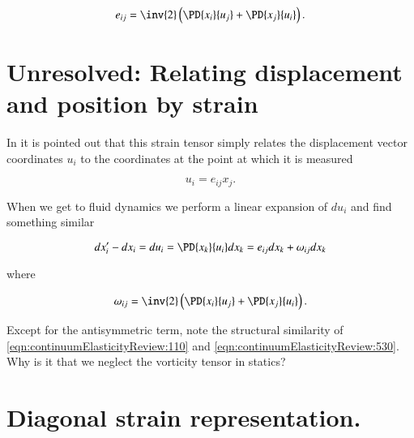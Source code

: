 \begin{equation}\label{eqn:continuumElasticityReview:90}
e_{ij}
=
\inv{2}
\left( 
\PD{x_i}{u_j} + 
\PD{x_j}{u_i} 
\right).
\end{equation}

\section{Unresolved: Relating displacement and position by strain}

In \cite{feynman1963flp:elasticMaterials} it is pointed out that this strain tensor simply relates the displacement vector coordinates $u_i$ to the coordinates at the point at which it is measured

\begin{equation}\label{eqn:continuumElasticityReview:110}
u_i = e_{ij} x_j.
\end{equation}

When we get to fluid dynamics we perform a linear expansion of $du_i$ and find something similar

\begin{equation}\label{eqn:continuumElasticityReview:530}
dx_i' - dx_i = du_i = \PD{x_k}{u_i} dx_k = e_{ij} dx_k + \omega_{ij} dx_k
\end{equation}

where

\begin{equation}\label{eqn:continuumElasticityReview:550}
\omega_{ij} = \inv{2} \left( \PD{x_i}{u_j} +\PD{x_j}{u_i} \right).
\end{equation}

Except for the antisymmetric term, note the structural similarity of \ref{eqn:continuumElasticityReview:110} and \ref{eqn:continuumElasticityReview:530}.  Why is it that we neglect the vorticity tensor in statics?
%
%

\section{Diagonal strain representation.}

